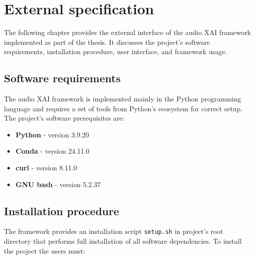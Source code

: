\documentclass[
    bindingoffset=5mm,  %
    footnoteindent=3mm, %
    hyphenation=true    %
]{src/wut-thesis}
\begin{document}
%
%
\clearpage %
\section{External specification} \label{ch:externalSpec}

The following chapter provides the external interface of the audio XAI framework implemented as
part of the thesis. It discusses the project's software requirements, installation procedure,
user interface, and framework usage.

\subsection{Software requirements} \label{ch4:DevelopmentSetup}

The audio XAI framework is implemented mainly in the Python programming language and
requires a set of tools from Python's ecosystem for correct setup.
The project's software prerequisites are:

\begin{itemize}
    \item \textbf{Python} - version 3.9.20
    \item \textbf{Conda} - version 24.11.0
    \item \textbf{curl} - version 8.11.0
    \item \textbf{GNU bash} -  version 5.2.37
\end{itemize}

\subsection{Installation procedure}

The framework provides an installation script \texttt{setup.sh} %
in project's root directory that performs full installation of all
software dependencies. To install the project the users must:
\end{document}
